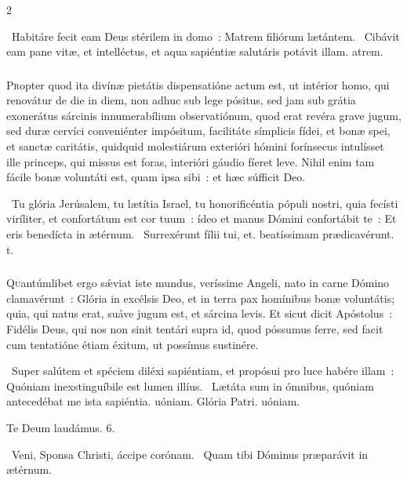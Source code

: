 \documentclass[9pt,twoside]{extarticle}
\begin{document}
\begin{multicols}{2}
{{{\begin{tightlist}{}
\item {}~Habitáre fecit eam Deus stérilem in domo~: \textred{*} Matrem filiórum lætántem. ~Cibávit eam pane vitæ, et intelléctus, et aqua sapiéntiæ salutáris potávit illam. atrem.
\end{tightlist}

\subsubsection*{\center {}}
\lettrine{P}ropter quod ita divínæ pietátis dispensatióne actum est, ut intérior homo, qui renovátur de die in diem, non adhuc sub lege pósitus, sed jam sub grátia exonerátus sárcinis innumerabílium observatiónum, quod erat revéra grave jugum, sed duræ cervíci conveniénter impósitum, facilitáte símplicis fídei, et bonæ spei, et sanctæ caritátis, quidquid molestiárum exterióri hómini forínsecus intulísset ille princeps, qui missus est foras, interióri gáudio fíeret leve. Nihil enim tam fácile bonæ voluntáti est, quam ipsa sibi~: et hæc súfficit Deo.

\begin{tightlist}{}
\item {}~Tu glória Jerúsalem, tu lætítia Israel, tu honorificéntia pópuli nostri, quia fecísti viríliter, et confortátum est cor tuum~: ídeo et manus Dómini confortábit te~: \textred{*} Et eris benedícta in ætérnum. ~Surrexérunt fílii tui, et. beatíssimam prædicavérunt. t.
\end{tightlist}

\subsubsection*{\center {}}
\lettrine{Q}uantúmlibet ergo sǽviat iste mundus, veríssime Angeli, nato in carne Dómino clamavérunt~: Glória in excélsis Deo, et in terra pax homínibus bonæ voluntátis; quia, qui natus erat, suáve jugum est, et sárcina levis. Et sicut dicit Apóstolus~: Fidélis Deus, qui nos non sinit tentári supra id, quod póssumus ferre, sed facit cum tentatióne étiam éxitum, ut possímus sustinére.

\begin{tightlist}{}
\item {}~Super salútem et spéciem diléxi sapiéntiam, et propósui pro luce habére illam~: \textred{*} Quóniam inexstinguíbile est lumen illíus. ~Lætáta sum in ómnibus, quóniam antecedébat me ista sapiéntia. uóniam. Glória Patri. uóniam.
\item Te Deum laudámus. 6.
\item {}~Veni, Sponsa Christi, áccipe corónam. ~Quam tibi Dóminus præparávit in ætérnum.
\end{tightlist}

}}}
\end{multicols}
\end{document}
